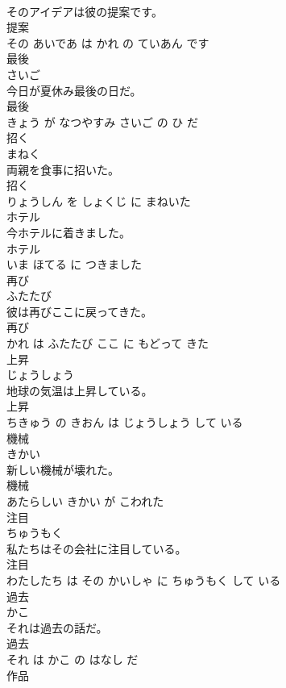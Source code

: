 \documentclass[8pt]{extreport}
\begin{document}
\begin{CJK}{UTF8}{min}
\\	そのアイデアは彼の提案です。	
\\	提案 
\\	その あいであ は かれ の ていあん です			
\\	最後	
\\	さいご			
\\	今日が夏休み最後の日だ。	
\\	最後 
\\	きょう が なつやすみ さいご の ひ だ			
\\	招く	
\\	まねく			
\\	両親を食事に招いた。	
\\	招く 
\\	りょうしん を しょくじ に まねいた			
\\	ホテル	
\\	今ホテルに着きました。	
\\	ホテル 
\\	いま ほてる に つきました			
\\	再び	
\\	ふたたび			
\\	彼は再びここに戻ってきた。	
\\	再び 
\\	かれ は ふたたび ここ に もどって きた			
\\	上昇	
\\	じょうしょう			
\\	地球の気温は上昇している。	
\\	上昇 
\\	ちきゅう の きおん は じょうしょう して いる			
\\	機械	
\\	きかい			
\\	新しい機械が壊れた。	
\\	機械 
\\	あたらしい きかい が こわれた			
\\	注目	
\\	ちゅうもく			
\\	私たちはその会社に注目している。	
\\	注目 
\\	わたしたち は その かいしゃ に ちゅうもく して いる			
\\	過去	
\\	かこ			
\\	それは過去の話だ。	
\\	過去 
\\	それ は かこ の はなし だ			
\\	作品	

\end{CJK}
\end{document}
